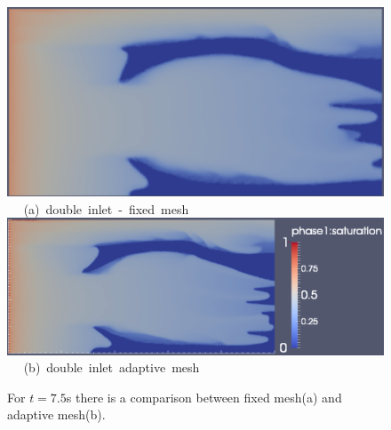 \begin{landscape}
\begin{figure}[ht] 
\vbox{
\hbox{\hspace{3.5cm}
\includegraphics[width=.65\textwidth]{./Pics1/5reg_dinlet_fixed_1500.pdf} 
}
\vspace{0.0cm}
\hbox{\hspace{6.5cm} (a) double inlet - fixed mesh   
}
\hbox{\hspace{3.5cm}
\includegraphics[width=.9\textwidth]{./Pics1/5reg_dinlet_adapt_1500_1.pdf}
}
\vspace{0.0cm}
\hbox{\hspace{6.5cm} (b) double inlet adaptive mesh   
}
}     
\caption{For $t=7.5$s there is a comparison between fixed mesh(a) and adaptive mesh(b).}
\label{fig:3testcase_c}
\end{figure}
\end{landscape}
\clearpage

